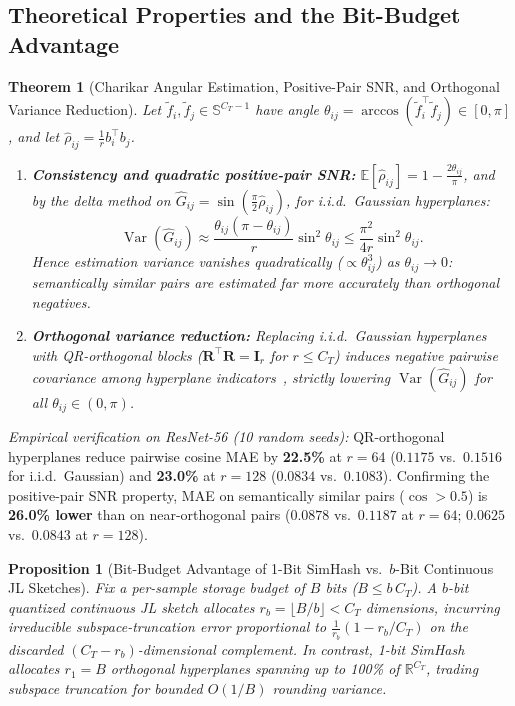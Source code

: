 \documentclass{article}
\newtheorem{proposition}{Proposition}
\newtheorem{theorem}{Theorem}
\begin{document}
\subsection{Theoretical Properties and the Bit-Budget Advantage}

\begin{theorem}[Charikar Angular Estimation, Positive-Pair SNR, and Orthogonal Variance Reduction]
\label{thm:simhash}
Let $\tilde{f}_i, \tilde{f}_j \in \mathbb{S}^{C_T-1}$ have angle $\theta_{ij} = \arccos(\tilde{f}_i^\top \tilde{f}_j)\in[0,\pi]$, and let $\hat{\rho}_{ij} = \frac{1}{r}b_i^\top b_j$.
\begin{enumerate}
    \item \textbf{Consistency and quadratic positive-pair SNR:} $\mathbb{E}[\hat{\rho}_{ij}] = 1 - \frac{2\theta_{ij}}{\pi}$, and by the delta method on $\hat{G}_{ij} = \sin(\frac{\pi}{2}\hat{\rho}_{ij})$, for i.i.d.\ Gaussian hyperplanes:
    \begin{equation}
        \operatorname{Var}(\hat{G}_{ij}) \approx \frac{\theta_{ij}(\pi - \theta_{ij})}{r}\sin^2\theta_{ij} \le \frac{\pi^2}{4r}\sin^2\theta_{ij}.
    \end{equation}
    Hence estimation variance vanishes quadratically ($\propto \theta_{ij}^3$) as $\theta_{ij}\to 0$: semantically similar pairs are estimated far more accurately than orthogonal negatives.
    \item \textbf{Orthogonal variance reduction:} Replacing i.i.d.\ Gaussian hyperplanes with QR-orthogonal blocks ($\mathbf{R}^\top\mathbf{R}=\mathbf{I}_r$ for $r\le C_T$) induces negative pairwise covariance among hyperplane indicators~\citep{choromanski2017unreasonable}, strictly lowering $\operatorname{Var}(\hat{G}_{ij})$ for all $\theta_{ij}\in(0,\pi)$.
\end{enumerate}
\end{theorem}

\noindent\textit{Empirical verification on ResNet-56 (10 random seeds):} QR-orthogonal hyperplanes reduce pairwise cosine MAE by \textbf{22.5\%} at $r=64$ ($0.1175$ vs.\ $0.1516$ for i.i.d.\ Gaussian) and \textbf{23.0\%} at $r=128$ ($0.0834$ vs.\ $0.1083$). Confirming the positive-pair SNR property, MAE on semantically similar pairs ($\cos > 0.5$) is \textbf{26.0\% lower} than on near-orthogonal pairs ($0.0878$ vs.\ $0.1187$ at $r=64$; $0.0625$ vs.\ $0.0843$ at $r=128$).

\begin{proposition}[Bit-Budget Advantage of 1-Bit SimHash vs.\ $b$-Bit Continuous JL Sketches]
\label{prop:bitbudget}
Fix a per-sample storage budget of $B$ bits ($B \le b\,C_T$). A $b$-bit quantized continuous JL sketch allocates $r_b = \lfloor B/b \rfloor < C_T$ dimensions, incurring irreducible subspace-truncation error proportional to $\frac{1}{r_b}(1 - r_b/C_T)$ on the discarded $(C_T - r_b)$-dimensional complement. In contrast, 1-bit SimHash allocates $r_1 = B$ orthogonal hyperplanes spanning up to 100\% of $\mathbb{R}^{C_T}$, trading subspace truncation for bounded $O(1/B)$ rounding variance.
\end{proposition}
\end{document}
